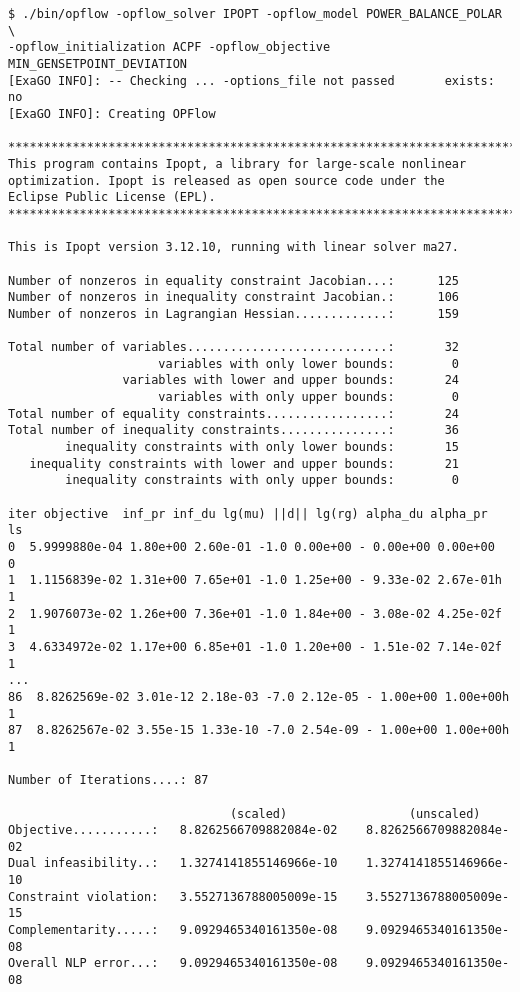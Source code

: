 \begin{lstlisting}
$ ./bin/opflow -opflow_solver IPOPT -opflow_model POWER_BALANCE_POLAR \
-opflow_initialization ACPF -opflow_objective MIN_GENSETPOINT_DEVIATION
[ExaGO INFO]: -- Checking ... -options_file not passed       exists: no
[ExaGO INFO]: Creating OPFlow

*************************************************************************
This program contains Ipopt, a library for large-scale nonlinear 
optimization. Ipopt is released as open source code under the 
Eclipse Public License (EPL).
*************************************************************************

This is Ipopt version 3.12.10, running with linear solver ma27.

Number of nonzeros in equality constraint Jacobian...:      125
Number of nonzeros in inequality constraint Jacobian.:      106
Number of nonzeros in Lagrangian Hessian.............:      159

Total number of variables............................:       32
                     variables with only lower bounds:        0
                variables with lower and upper bounds:       24
                     variables with only upper bounds:        0
Total number of equality constraints.................:       24
Total number of inequality constraints...............:       36
        inequality constraints with only lower bounds:       15
   inequality constraints with lower and upper bounds:       21
        inequality constraints with only upper bounds:        0

iter objective  inf_pr inf_du lg(mu) ||d|| lg(rg) alpha_du alpha_pr  ls
0  5.9999880e-04 1.80e+00 2.60e-01 -1.0 0.00e+00 - 0.00e+00 0.00e+00  0
1  1.1156839e-02 1.31e+00 7.65e+01 -1.0 1.25e+00 - 9.33e-02 2.67e-01h 1
2  1.9076073e-02 1.26e+00 7.36e+01 -1.0 1.84e+00 - 3.08e-02 4.25e-02f 1
3  4.6334972e-02 1.17e+00 6.85e+01 -1.0 1.20e+00 - 1.51e-02 7.14e-02f 1
...
86  8.8262569e-02 3.01e-12 2.18e-03 -7.0 2.12e-05 - 1.00e+00 1.00e+00h 1
87  8.8262567e-02 3.55e-15 1.33e-10 -7.0 2.54e-09 - 1.00e+00 1.00e+00h 1

Number of Iterations....: 87

                               (scaled)                 (unscaled)
Objective...........:   8.8262566709882084e-02    8.8262566709882084e-02
Dual infeasibility..:   1.3274141855146966e-10    1.3274141855146966e-10
Constraint violation:   3.5527136788005009e-15    3.5527136788005009e-15
Complementarity.....:   9.0929465340161350e-08    9.0929465340161350e-08
Overall NLP error...:   9.0929465340161350e-08    9.0929465340161350e-08



\end{lstlisting}

